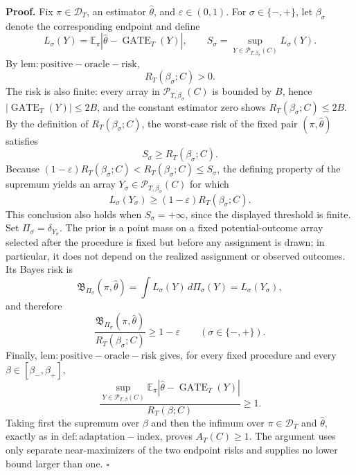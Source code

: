 \textbf{Proof.} Fix \(\pi\in\mathcal D_T\), an estimator \(\widehat\theta\), and \(\varepsilon\in(0,1)\). For \(\sigma\in\{-,+\}\), let \(\beta_\sigma\) denote the corresponding endpoint and define
\[
L_\sigma(Y)=\mathbb E_\pi\left|\widehat\theta-\operatorname{GATE}_T(Y)\right|,
\qquad
S_\sigma=\sup_{Y\in\mathcal P_{T,\beta_\sigma}(C)}L_\sigma(Y).
\]
By \(\mathrm{lem:positive-oracle-risk}\),
\[
R_T(\beta_\sigma;C)>0.
\]
The risk is also finite: every array in \(\mathcal P_{T,\beta_\sigma}(C)\) is bounded by \(B\), hence \(\left|\operatorname{GATE}_T(Y)\right|\le 2B\), and the constant estimator zero shows \(R_T(\beta_\sigma;C)\le2B\). By the definition of \(R_T(\beta_\sigma;C)\), the worst-case risk of the fixed pair \((\pi,\widehat\theta)\) satisfies
\[
S_\sigma\ge R_T(\beta_\sigma;C).
\]
Because \((1-\varepsilon)R_T(\beta_\sigma;C)<R_T(\beta_\sigma;C)\le S_\sigma\), the defining property of the supremum yields an array \(Y_\sigma\in\mathcal P_{T,\beta_\sigma}(C)\) for which
\[
L_\sigma(Y_\sigma)\ge (1-\varepsilon)R_T(\beta_\sigma;C).
\]
This conclusion also holds when \(S_\sigma=+\infty\), since the displayed threshold is finite. Set \(\Pi_\sigma=\delta_{Y_\sigma}\). The prior is a point mass on a fixed potential-outcome array selected after the procedure is fixed but before any assignment is drawn; in particular, it does not depend on the realized assignment or observed outcomes. Its Bayes risk is
\[
\mathfrak B_{\Pi_\sigma}(\pi,\widehat\theta)
=\int L_\sigma(Y)\,d\Pi_\sigma(Y)
=L_\sigma(Y_\sigma),
\]
and therefore
\[
\frac{\mathfrak B_{\Pi_\sigma}(\pi,\widehat\theta)}{R_T(\beta_\sigma;C)}\ge1-\varepsilon
\qquad(\sigma\in\{-,+\}).
\]
Finally, \(\mathrm{lem:positive-oracle-risk}\) gives, for every fixed procedure and every \(\beta\in[\beta_-,\beta_+]\),
\[
\frac{\sup_{Y\in\mathcal P_{T,\beta}(C)}\mathbb E_\pi\left|\widehat\theta-\operatorname{GATE}_T(Y)\right|}{R_T(\beta;C)}\ge1.
\]
Taking first the supremum over \(\beta\) and then the infimum over \(\pi\in\mathcal D_T\) and \(\widehat\theta\), exactly as in \(\mathrm{def:adaptation-index}\), proves \(A_T(C)\ge1\). The argument uses only separate near-maximizers of the two endpoint risks and supplies no lower bound larger than one. \(\square\)